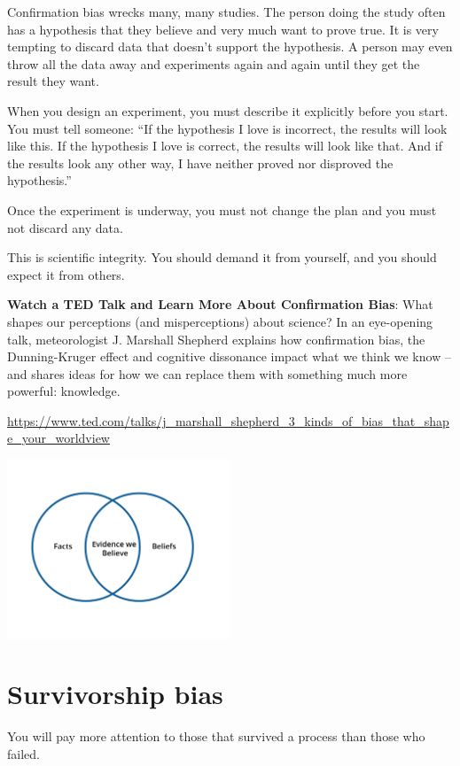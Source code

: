 Confirmation bias wrecks many, many studies. The person doing the
study often has a hypothesis that they believe and very much want to
prove true. It is very tempting to discard data that doesn't support
the hypothesis. A person may even throw all the data away and experiments again and again until they get the result they want.

When you design an experiment, you must describe it explicitly before
you start. You must tell someone: ``If the hypothesis I love is
incorrect, the results will look like this.  If the hypothesis I love
is correct, the results will look like that. And if the results look
any other way, I have neither proved nor disproved the hypothesis.''

Once the experiment is underway, you must not change the plan and you
must not discard any data.

This is scientific integrity. You should demand it from yourself, and
you should expect it from others.

\textbf{Watch a TED Talk and Learn More About Confirmation Bias}: 
What shapes our perceptions (and misperceptions) about science? In an eye-opening talk, meteorologist J. Marshall Shepherd explains how confirmation bias, the Dunning-Kruger effect and cognitive dissonance impact what we think we know -- and shares ideas for how we can replace them with something much more powerful: knowledge.

\url{https://www.ted.com/talks/j_marshall_shepherd_3_kinds_of_bias_that_shape_your_worldview}

\includegraphics[width=0.5\textwidth]{confirmationBias2.png}


\section{Survivorship bias}

You will pay more attention to those that survived a process than
those who failed.

